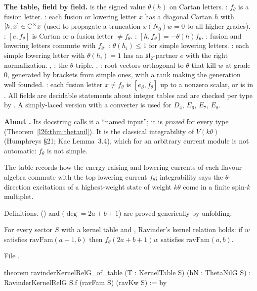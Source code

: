 \begin{dictionary}
\textbf{The table, field by field.}  is the signed value $\theta(h)$ on Cartan letters. : $f_\theta$ is a
fusion letter. : each fusion or lowering letter $x$ has a diagonal Cartan $h$ with $[h,x]\in{\mathbb{C}}^\times x$ (used to
propagate a truncation $x(N_0)w=0$ to all higher grades). : $[e,f_\theta]$ is Cartan or a fusion letter $\neq f_\theta$.
: $[h,f_\theta]=-\theta(h)f_\theta$. : fusion and lowering letters commute with $f_\theta$.
: $\theta(h_i)\le1$ for simple lowering letters. : each simple lowering letter with $\theta(h_i)=1$ has an
$\mathfrak{sl}_2$-partner $e$ with the right normalization. , : the $\theta$-triple. , : root
vectors orthogonal to $\theta$ that kill $w$ at grade $0$, generated by brackets from simple ones, with a rank making the generation
well founded. : each fusion letter $x\neq f_\theta$ is $[e_\beta,f_\theta]$ up to a nonzero scalar, or is in
. All fields are decidable statements about integer tables and are checked per type by . A
simply-laced version  with a converter  is used for $D_4$, $E_6$, $E_7$, $E_8$.

\textbf{About .} Its docstring calls it a ``named input''; it is \emph{proved} for every type
(Theorem~\ref{l26:thm:thetanil}). It is the classical integrability of $V(k\theta)$ (Humphreys \S21; Kac Lemma~3.4), which for an
arbitrary current module is not automatic: $f_\theta$ is not simple.
\end{dictionary}

\begin{physics}
The table records how the energy-raising and lowering currents of each flavour algebra commute with the top lowering current
$f_\theta$; integrability says the $\theta$-direction excitations of a highest-weight state of weight $k\theta$ come in a finite
spin-$k$ multiplet.
\end{physics}

\begin{status}
Definitions.  () and  ($\deg=2a+b+1$) are proved generically by unfolding.
\end{status}

\begin{theorem}\label{l26:thm:kernelG}
For every sector $S$ with a kernel table and , Ravinder's kernel relation holds: if $w$ satisfies
$\mathrm{ravFam}(a+1,b)$ then $f_\theta(2a+b+1)w$ satisfies $\mathrm{ravFam}(a,b)$.
\end{theorem}
\noindent File .
\begin{leancode}
theorem ravinderKernelRelG_of_table (T : KernelTable S) (hN : ThetaNilG S) :
    RavinderKernelRelG S.f (ravFam S) (ravKw S) := by
\end{leancode}

